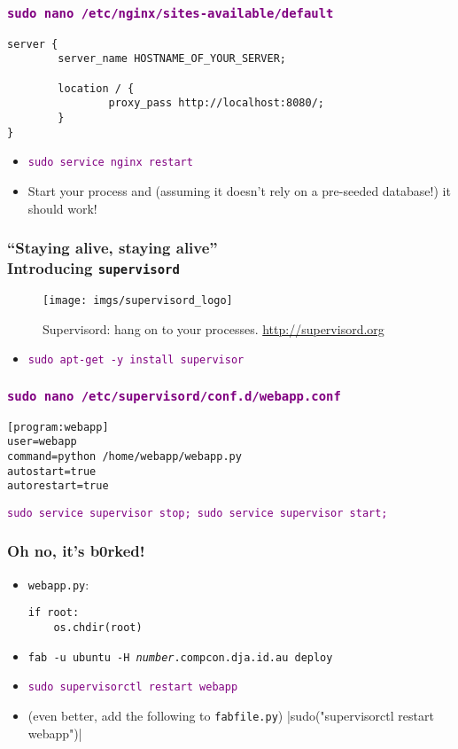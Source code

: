 \documentclass{beamer}
\newcommand\aws[1]{\textcolor{purple}{\texttt{#1}}}
\begin{document}
\begin{frame}[fragile]
  \frametitle{\aws{sudo nano /etc/nginx/sites-available/default}}

\begin{verbatim}
server {
        server_name HOSTNAME_OF_YOUR_SERVER;

        location / {
                proxy_pass http://localhost:8080/;
        }
}
\end{verbatim}

  \begin{itemize}
  \item \aws{sudo service nginx restart}
  \item Start your process and (assuming it doesn't rely on a
    pre-seeded database!) it should work!
  \end{itemize}
\end{frame}

\begin{frame}
  \frametitle{``Staying alive, staying alive''\\Introducing
    \texttt{supervisord}}
  \begin{figure}[h!]
    \centering
    \texttt{[image: imgs/supervisord\_logo]}
    \caption{Supervisord: hang on to your processes. \url{http://supervisord.org} }
    \label{fig:supervisord_logo}
  \end{figure}

  \begin{itemize}
  \item \aws{sudo apt-get -y install supervisor}
  \end{itemize}
  
\end{frame}

\begin{frame}[fragile]
  \frametitle{\aws{sudo nano /etc/supervisord/conf.d/webapp.conf}}
\begin{verbatim}
[program:webapp]
user=webapp
command=python /home/webapp/webapp.py
autostart=true
autorestart=true
\end{verbatim}
  \aws{sudo service supervisor stop; sudo service supervisor start;}
\end{frame}

\begin{frame}[fragile]
  \frametitle{Oh no, it's b0rked!}

  \begin{itemize}
  \item<1-> \texttt{webapp.py}: 
\begin{verbatim}
if root:
    os.chdir(root)
\end{verbatim}
  \item<2-> \texttt{fab -u ubuntu -H \textit{number}.compcon.dja.id.au
      deploy}
  \item<2-> \aws{sudo supervisorctl restart webapp}
  \item<3-> (even better, add the following to \texttt{fabfile.py})
|sudo("supervisorctl restart webapp")|
  \end{itemize}
\end{frame}
\end{document}
